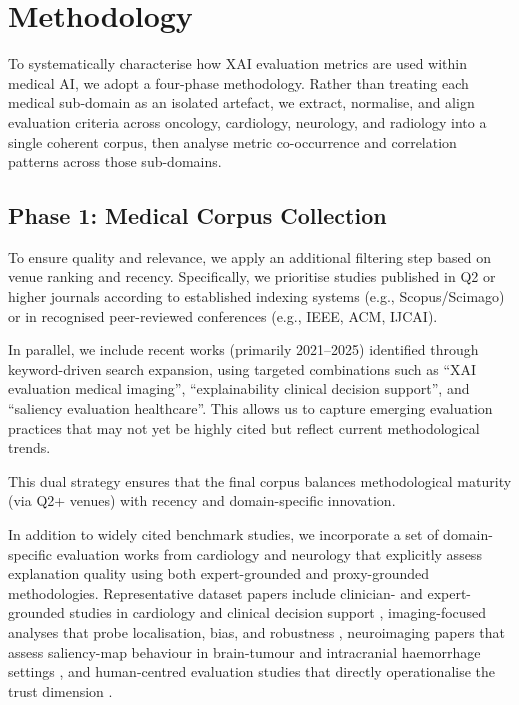 \section{Methodology}

To systematically characterise how XAI evaluation metrics are used within
medical AI, we adopt a four-phase methodology. Rather than treating each
medical sub-domain as an isolated artefact, we extract, normalise, and
align evaluation criteria across oncology, cardiology, neurology, and
radiology into a single coherent corpus, then analyse metric co-occurrence
and correlation patterns across those sub-domains.


\subsection{Phase 1: Medical Corpus Collection}
To ensure quality and relevance, we apply an additional filtering step based on venue ranking and recency. Specifically, we prioritise studies published in Q2 or higher journals according to established indexing systems (e.g., Scopus/Scimago) or in recognised peer-reviewed conferences (e.g., IEEE, ACM, IJCAI). 

In parallel, we include recent works (primarily 2021–2025) identified through keyword-driven search expansion, using targeted combinations such as ``XAI evaluation medical imaging'', ``explainability clinical decision support'', and ``saliency evaluation healthcare''. This allows us to capture emerging evaluation practices that may not yet be highly cited but reflect current methodological trends.

This dual strategy ensures that the final corpus balances methodological maturity (via Q2+ venues) with recency and domain-specific innovation. 

In addition to widely cited benchmark studies, we incorporate a set of domain-specific evaluation works from cardiology and neurology that explicitly assess explanation quality using both expert-grounded and proxy-grounded methodologies. Representative dataset papers include clinician- and expert-grounded studies in cardiology and clinical decision support \cite{Vazquez2021, Piculin2022, Nurmaini2022, MorenoSanchez2023, Pandey2024}, imaging-focused analyses that probe localisation, bias, and robustness \cite{Lee2021Cardiomegaly, palatnik2021xai, Repetto2025EvaluatingTR, Pertuz2023, Patricio2024}, neuroimaging papers that assess saliency-map behaviour in brain-tumour and intracranial haemorrhage settings \cite{Nazir2024UtilizingCC, Chmiel2023, Kohan2025}, and human-centred evaluation studies that directly operationalise the trust dimension \cite{IhongbeFouad2024, 11355720}.

